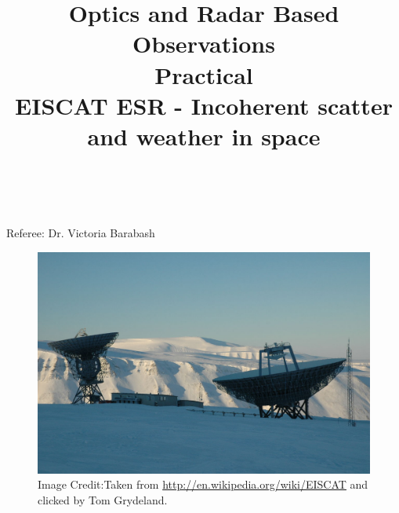 \documentclass{article}
\title{\textbf {Optics and Radar Based Observations} \\ Practical\\ EISCAT ESR - Incoherent scatter and weather in space} %
\author{\authorivan\\\authoranu}
\begin{document}
\maketitle %

\centerline{Referee: Dr. Victoria Barabash}

\vspace{10mm}

\begin{figure}[h!]
\centering
\includegraphics[width=\textwidth]{Figures/eiscat.jpg}
\caption*{Image Credit:Taken from \url{http://en.wikipedia.org/wiki/EISCAT} and clicked by Tom Grydeland.}
\end{figure}

\setlength\parindent{0pt} %

\renewcommand{\labelenumi}{\alph{enumi}.} %
\clearpage

\tableofcontents

\listoffigures

\clearpage

\end{document}
